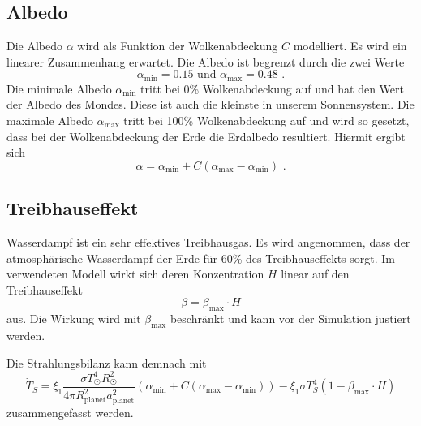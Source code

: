 \begin{refsection}
\subsection{Albedo}
Die Albedo $\alpha$ wird als Funktion der Wolkenabdeckung $C$ modelliert. Es wird ein linearer Zusammenhang erwartet. Die Albedo ist begrenzt durch die zwei Werte
\begin{equation}
\alpha_{\text{min}} = 0.15 \text{ und } \alpha_{\text{max}} = 0.48 \text{ .}
\end{equation}
Die minimale Albedo $\alpha_{\text{min}}$ tritt bei 0\% Wolkenabdeckung auf und hat den Wert der Albedo des Mondes. Diese ist auch die kleinste in unserem Sonnensystem. Die maximale Albedo $\alpha_{\text{max}}$ tritt bei 100\% Wolkenabdeckung auf und wird so gesetzt, dass bei der Wolkenabdeckung der Erde die Erdalbedo resultiert. Hiermit ergibt sich
\begin{equation}
\alpha = \alpha_{\text{min}} + C(\alpha_{\text{max}} - \alpha_{\text{min}}) \text{ .}
\end{equation}

\subsection{Treibhauseffekt}
Wasserdampf ist ein sehr effektives Treibhausgas. Es wird angenommen, dass der atmosphärische Wasserdampf der Erde für 60\% des Treibhauseffekts sorgt. \cite{planeten:treibhauseffekt}  
Im verwendeten Modell wirkt sich deren Konzentration $H$ linear auf den Treibhauseffekt 
\begin{equation}
\beta  = \beta_{\text{max}} \cdot H
\end{equation}
aus. Die Wirkung wird mit $\beta_{\text{max}}$ beschränkt und kann vor der Simulation justiert werden.

Die Strahlungsbilanz kann demnach mit
\begin{equation}
\dot{T}_S = \xi_1 \frac{\sigma T_{\astrosun}^4 R_{\astrosun}^2}{4 \pi R_{\text{planet}}^2 a_{\text{planet}}^2} (\alpha_{\text{min}} + C(\alpha_{\text{max}} - \alpha_{\text{min}})) - \xi_1 \sigma T_{S}^4  (1 - \beta_{\text{max}} \cdot H)
\end{equation}
zusammengefasst werden.


\end{refsection}
